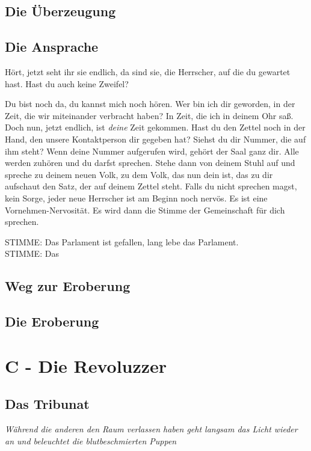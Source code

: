\documentclass[a4paper, 12pt]{report}
\begin{document}
\subsection{Die Überzeugung}

\subsection{Die Ansprache}
Hört, jetzt seht ihr sie endlich, da sind sie, die Herrscher, auf die du gewartet hast.
Hast du auch keine Zweifel? 

Du bist noch da, du kannst mich noch hören.
Wer bin ich dir geworden, in der Zeit, die wir miteinander verbracht haben?
In Zeit, die ich in deinem Ohr saß.
Doch nun, jetzt endlich, ist \textit{deine} Zeit gekommen. 
Hast du den Zettel noch in der Hand, den unsere Kontaktperson dir gegeben hat?
Siehst du dir Nummer, die auf ihm steht?
Wenn deine Nummer aufgerufen wird, gehört der Saal ganz dir.
Alle werden zuhören und du darfst sprechen. 
Stehe dann von deinem Stuhl auf und spreche zu deinem neuen Volk, zu dem Volk, das nun dein ist,
das zu dir aufschaut den Satz, der auf deinem Zettel steht.
Falls du nicht sprechen magst, kein Sorge, jeder neue Herrscher ist am Beginn noch nervös.
Es ist eine Vornehmen-Nervosität. 
Es wird dann die Stimme der Gemeinschaft für dich sprechen.

STIMME: Das Parlament ist gefallen, lang lebe das Parlament.\\
STIMME: Das


\subsection{Weg zur Eroberung}

\subsection{Die Eroberung}

\section{C - Die Revoluzzer}

\subsection{Das Tribunat}
\textit{Während die anderen den Raum verlassen haben geht langsam das Licht wieder an und beleuchtet die blutbeschmierten Puppen}
\end{document}
